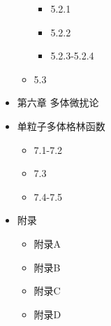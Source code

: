 \begin{itemize}
\begin{itemize}
\begin{itemize}
				\item [\CheckedBox] 5.2.1
				\item [\CheckedBox] 5.2.2
				\item [\Square] 5.2.3-5.2.4
			\end{itemize}
			\item[\Square] 5.3
	    \end{itemize}
    \item[\CheckedBox] 第六章 多体微扰论 
    \item[\DSquare] 单粒子多体格林函数 
    	\begin{itemize}
	        \item[\CheckedBox] 7.1-7.2
	        \item[\DSquare] 7.3
	        \item[\Square] 7.4-7.5 
    	\end{itemize}
    \item[\DSquare]  附录 \begin{itemize}
        \item[\CheckedBox] 附录A
        \item[\CheckedBox] 附录B
        \item[\Square] 附录C
        \item[\CheckedBox] 附录D
    \end{itemize}
\end{itemize}

